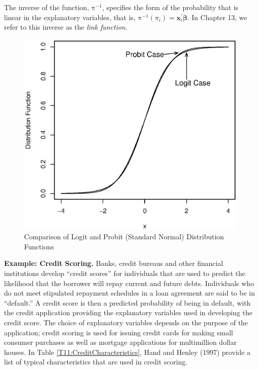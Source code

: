 The inverse of the function, $\mathrm{\pi }^{-1}$, specifies the
form of the probability that is linear in the explanatory variables,
that is, $\mathrm{\pi }^{-1}(\pi_i)=
\mathbf{x}_i^{\mathbf{\prime}}\boldsymbol \beta$. In Chapter 13, we
refer to this inverse as the \emph{link function}.


\begin{figure}[htp]
  \begin{center}
    \includegraphics[width=1\textwidth,angle=0,scale=0.5]{Chapter11Binary/F11LogitProbit.eps}
    \caption{\label{F11:LogitProbit} \small Comparison of Logit and Probit (Standard Normal) Distribution
Functions}
  \end{center}
\end{figure}


\linejed{}

\textbf{Example: Credit Scoring.} Banks,
credit bureaus and other financial institutions develop ``credit
scores'' for individuals that are used to predict the likelihood
that the borrower will repay current and future debts. Individuals who
do not meet stipulated repayment schedules in a loan agreement are
said to be in ``default.'' A credit score is then a predicted
probability of being in default, with the credit application
providing the explanatory variables used in developing the credit
score. The choice of explanatory variables depends on the purpose of
the application; credit scoring is used for issuing credit cards for
making small consumer purchases as well as mortgage applications for
multimillion dollar houses. In Table
\ref{T11:CreditCharacteristics}, Hand and Henley (1997) provide a
list of typical characteristics that are used in credit scoring.


